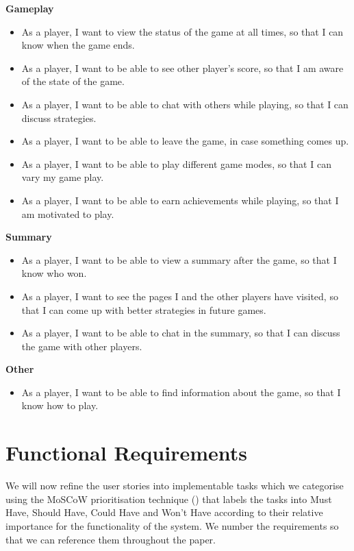 \documentclass{l4proj}
\begin{document}
\textbf{Gameplay}
\begin{itemize}
    \item As a player, I want to view the status of the game at all times, so that I can know when the game ends.
    \item As a player, I want to be able to see other player's score, so that I am aware of the state of the game.
    \item As a player, I want to be able to chat with others while playing, so that I can discuss strategies.
    \item As a player, I want to be able to leave the game, in case something comes up.
    \item As a player, I want to be able to play different game modes, so that I can vary my game play.
    \item As a player, I want to be able to earn achievements while playing, so that I am motivated to play.
\end{itemize}

\textbf{Summary}
\begin{itemize}
    \item As a player, I want to be able to view a summary after the game, so that I know who won.
    \item As a player, I want to see the pages I and the other players have visited, so that I can come up with better strategies in future games.
    \item As a player, I want to be able to chat in the summary, so that I can discuss the game with other players.
\end{itemize}

\textbf{Other}
\begin{itemize}
    \item As a player, I want to be able to find information about the game, so that I know how to play.
\end{itemize}

\section{Functional Requirements}
We will now refine the user stories into implementable tasks which we categorise using the MoSCoW prioritisation technique (\cite{moscow}) that labels the tasks into Must Have, Should Have, Could Have and Won't Have according to their relative importance for the functionality of the system. We number the requirements so that we can reference them throughout the paper.
\end{document}
